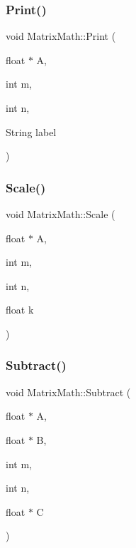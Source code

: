 \mbox{\label{class_matrix_math_a1ebe7b2f52b37c22ae933728951bcaa2}} 
\subsubsection{\texorpdfstring{Print()}{Print()}}
{\footnotesize\ttfamily void Matrix\+Math\+::\+Print (\begin{DoxyParamCaption}\item[{float $\ast$}]{A,  }\item[{int}]{m,  }\item[{int}]{n,  }\item[{String}]{label }\end{DoxyParamCaption})}

\mbox{\label{class_matrix_math_ada635d2211662e26c6efe867481505bb}} 
\subsubsection{\texorpdfstring{Scale()}{Scale()}}
{\footnotesize\ttfamily void Matrix\+Math\+::\+Scale (\begin{DoxyParamCaption}\item[{float $\ast$}]{A,  }\item[{int}]{m,  }\item[{int}]{n,  }\item[{float}]{k }\end{DoxyParamCaption})}

\mbox{\label{class_matrix_math_a3f6f124c09f5bb74e231c2c3f579ae4a}} 
\subsubsection{\texorpdfstring{Subtract()}{Subtract()}}
{\footnotesize\ttfamily void Matrix\+Math\+::\+Subtract (\begin{DoxyParamCaption}\item[{float $\ast$}]{A,  }\item[{float $\ast$}]{B,  }\item[{int}]{m,  }\item[{int}]{n,  }\item[{float $\ast$}]{C }\end{DoxyParamCaption})}

